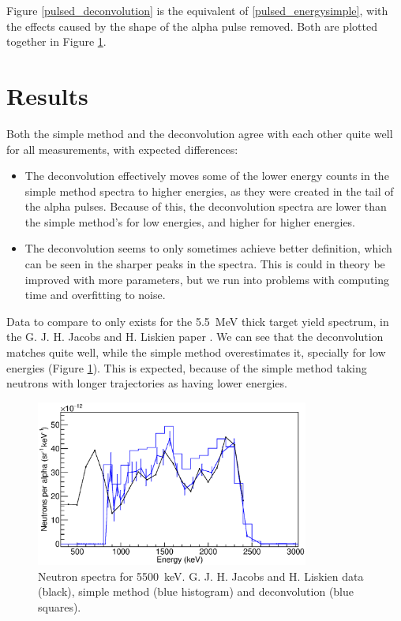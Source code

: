 \documentclass[a4paper,12pt]{report}
\begin{document}
Figure \ref{pulsed_deconvolution} is the equivalent of \ref{pulsed_energysimple}, with the effects caused by the shape of the alpha pulse removed.
Both are plotted together in Figure \ref{pulsed_5mev}.

\section{Results}
Both the simple method and the deconvolution agree with each other quite well for all measurements, with expected differences:
\begin{itemize}
	\item The deconvolution effectively moves some of the lower energy counts in the simple method spectra to higher energies, as they were created in the tail of the alpha pulses.
		Because of this, the deconvolution spectra are lower than the simple method's for low energies, and higher for higher energies.
	\item The deconvolution seems to only sometimes achieve better definition, which can be seen in the sharper peaks in the spectra.
		This is could in theory be improved with more parameters, but we run into problems with computing time and overfitting to noise.
\end{itemize}

Data to compare to only exists for the \qty{5.5}{\MeV} thick target yield spectrum, in the G. J. H. Jacobs and H. Liskien paper \cite{jacobs}.
We can see that the deconvolution matches quite well, while the simple method overestimates it, specially for low energies (Figure \ref{pulsed_5mev}).
This is expected, because of the simple method taking neutrons with longer trajectories as having lower energies.

\begin{figure}[H]
	\centering
	\includegraphics[width=0.80\textwidth]{pulsed_5mev.eps}
	\caption{Neutron spectra for \qty{5500}{\keV}.
	G. J. H. Jacobs and H. Liskien data (black), simple method (blue histogram) and deconvolution (blue squares).}
	\label{pulsed_5mev}
\end{figure}
\end{document}

